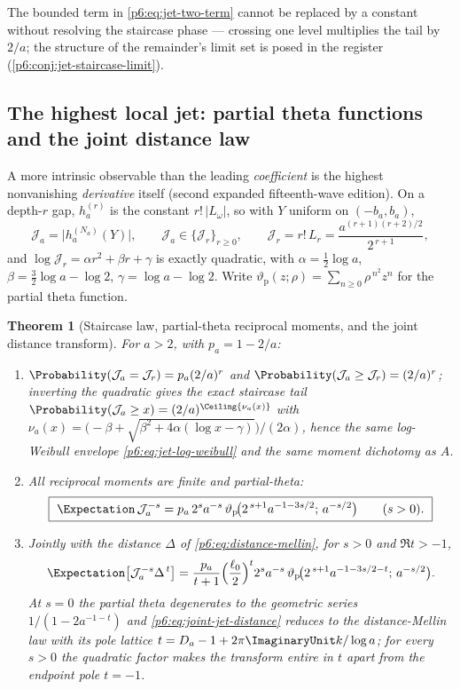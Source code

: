 \documentclass[11pt,oneside]{article}
\numberwithin{equation}{section}
\newtheorem{theorem}{Theorem}[section]
\theoremstyle{definition}
\theoremstyle{remark}
\begin{document}
The bounded term in \eqref{p6:eq:jet-two-term} cannot be replaced by a
constant without resolving the staircase phase --- crossing one level
multiplies the tail by $2/a$; the structure of the remainder's limit set
is posed in the register (\cref{p6:conj:jet-staircase-limit}).

\subsection{The highest local jet: partial theta functions and the joint
distance law}

A more intrinsic observable than the leading \emph{coefficient} is the
highest nonvanishing \emph{derivative} itself (second expanded
fifteenth-wave edition).  On a depth-$r$ gap, $h_a^{(r)}$ is the constant
$r!\,|L_\omega|$, so with $Y$ uniform on $(-b_a,b_a)$,
\[
 \mathcal J_a=\bigl|h_a^{(N_a)}(Y)\bigr|,
 \qquad
 \mathcal J_a\in\{\mathcal J_r\}_{r\ge0},
 \qquad
 \mathcal J_r=r!\,L_r=\frac{a^{(r+1)(r+2)/2}}{2^{\,r+1}},
\]
and $\log\mathcal J_r=\alpha r^2+\beta r+\gamma$ is exactly quadratic,
with $\alpha=\tfrac12\log a$, $\beta=\tfrac32\log a-\log2$,
$\gamma=\log a-\log2$.  Write
$\vartheta_{\mathrm p}(z;\rho)=\sum_{n\ge0}\rho^{\,n^2}z^n$ for the
partial theta function.

\begin{theorem}[Staircase law, partial-theta reciprocal moments, and the
joint distance transform]\label{p6:thm:highest-jet}
For $a>2$, with $p_a=1-2/a$:
\begin{enumerate}
\item $\Probability(\mathcal J_a=\mathcal J_r)=p_a(2/a)^r$ and
$\Probability(\mathcal J_a\ge\mathcal J_r)=(2/a)^r$; inverting the quadratic
gives the exact staircase tail
$\Probability(\mathcal J_a\ge x)=(2/a)^{\Ceiling{\nu_a(x)}}$ with
$\nu_a(x)=\bigl(-\beta+\sqrt{\beta^2+4\alpha(\log x-\gamma)}\bigr)/
(2\alpha)$, hence the same log-Weibull envelope
\eqref{p6:eq:jet-log-weibull} and the same moment dichotomy as $A$.
\item All reciprocal moments are finite and partial-theta:
\begin{equation}\label{p6:eq:highest-jet-ptheta}
 \boxed{\ \Expectation\,\mathcal J_a^{-s}
 =p_a\,2^{s}a^{-s}\,
 \vartheta_{\mathrm p}\!\bigl(2^{\,s+1}a^{-1-3s/2};\,a^{-s/2}\bigr)
 \qquad(s>0).\ }
\end{equation}
\item Jointly with the distance $\Delta$ of
\eqref{p6:eq:distance-mellin}, for $s>0$ and $\Re t>-1$,
\begin{equation}\label{p6:eq:joint-jet-distance}
 \Expectation\bigl[\mathcal J_a^{-s}\Delta^{\,t}\bigr]
 =\frac{p_a}{t+1}\Bigl(\frac{\ell_0}2\Bigr)^{t}2^{s}a^{-s}\,
 \vartheta_{\mathrm p}\!\bigl(2^{\,s+1}a^{-1-3s/2-t};\,a^{-s/2}\bigr).
\end{equation}
At $s=0$ the partial theta degenerates to the geometric series
$1/(1-2a^{-1-t})$ and \eqref{p6:eq:joint-jet-distance} reduces to the
distance-Mellin law with its pole lattice
$t=D_a-1+2\pi\ImaginaryUnit k/\log a$; for every $s>0$ the quadratic factor makes
the transform entire in $t$ apart from the endpoint pole $t=-1$.
\end{enumerate}
\end{theorem}
\end{document}
